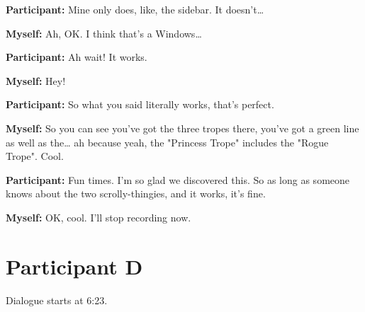 \documentclass[11pt]{report}
\begin{document}
\begin{linenumbers}
\textbf{Participant:} Mine only does, like, the sidebar. It doesn't\ldots{}

\textbf{Myself:} Ah, OK. I think that's a Windows\ldots{}

\textbf{Participant:} Ah wait! It works.

\textbf{Myself:} Hey!

\textbf{Participant:} So what you said literally works, that's perfect.

\textbf{Myself:} So you can see you've got the three tropes there, you've got a green line as well as the\ldots{} ah because yeah, the "Princess Trope" includes the "Rogue Trope". Cool.

\textbf{Participant:} Fun times. I'm so glad we discovered this. So as long as someone knows about the two scrolly-thingies, and it works, it's fine.

\textbf{Myself:} OK, cool. I'll stop recording now.

\end{linenumbers}
\resetlinenumber[1]
\section{Participant D}
Dialogue starts at 6:23.
\end{document}
